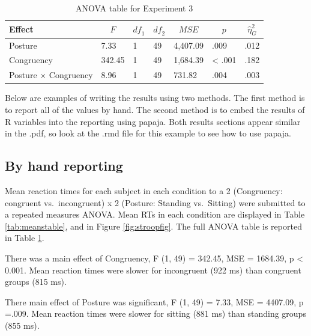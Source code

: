 \documentclass[
  man]{apa6}
\begin{document}
\begin{table}[tbp]
\begin{center}
\begin{threeparttable}
\caption{\label{tab:aovtable}ANOVA table for Experiment 3}
\begin{tabular}{lllllll}
\toprule
Effect & \multicolumn{1}{c}{$F$} & \multicolumn{1}{c}{$\mathit{df}_1$} & \multicolumn{1}{c}{$\mathit{df}_2$} & \multicolumn{1}{c}{$\mathit{MSE}$} & \multicolumn{1}{c}{$p$} & \multicolumn{1}{c}{$\hat{\eta}^2_G$}\\
\midrule
Posture & 7.33 & 1 & 49 & 4,407.09 & .009 & .012\\
Congruency & 342.45 & 1 & 49 & 1,684.39 & < .001 & .182\\
Posture $\times$ Congruency & 8.96 & 1 & 49 & 731.82 & .004 & .003\\
\bottomrule
\end{tabular}
\end{threeparttable}
\end{center}
\end{table}

Below are examples of writing the results using two methods. The first method is to report all of the values by hand. The second method is to embed the results of R variables into the reporting using papaja. Both results sections appear similar in the .pdf, so look at the .rmd file for this example to see how to use papaja.

\hypertarget{by-hand-reporting}{%
\subsection{By hand reporting}\label{by-hand-reporting}}

Mean reaction times for each subject in each condition to a 2 (Congruency: congruent vs.~incongruent) x 2 (Posture: Standing vs.~Sitting) were submitted to a repeated measures ANOVA. Mean RTs in each condition are displayed in Table \ref{tab:meanstable}, and in Figure \ref{fig:stroopfig}. The full ANOVA table is reported in Table \ref{tab:aovtable}.

There was a main effect of Congruency, F (1, 49) = 342.45, MSE = 1684.39, p \textless{} 0.001. Mean reaction times were slower for incongruent (922 ms) than congruent groups (815 ms).

There main effect of Posture was significant, F (1, 49) = 7.33, MSE = 4407.09, p =.009. Mean reaction times were slower for sitting (881 ms) than standing groups (855 ms).
\end{document}
